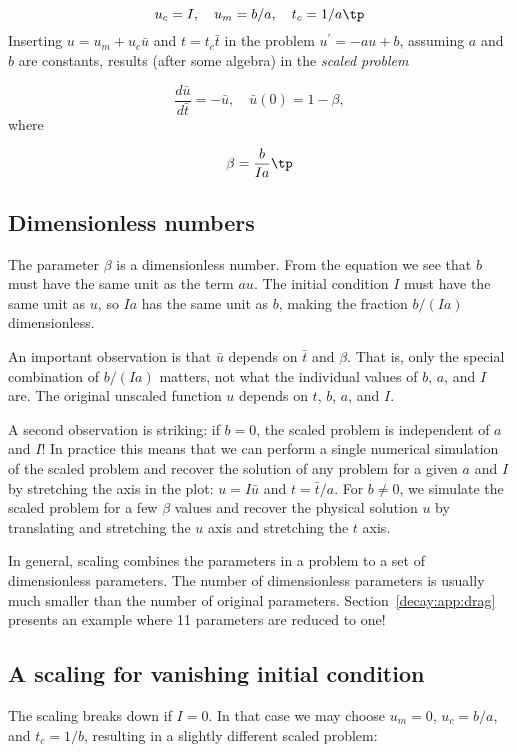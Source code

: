 \documentclass[graybox,sectrefs,envcountresetchap,open=right,final]{svmonodo}
\begin{document}
\[ u_c = I,\quad u_m = b/a,\quad t_c = 1/a\tp\]
Inserting $u=u_m + u_c\bar u$ and $t=t_c\bar t$ in the problem
$u^{\prime}=-au + b$, assuming $a$ and $b$ are constants, results (after some
algebra) in the \emph{scaled problem}

\[ \frac{d\bar u}{d\bar t} = -\bar u,\quad \bar u(0)=1 - \beta,\]
where

\[ \beta = \frac{b}{Ia}\tp\]

\subsection{Dimensionless numbers}

The parameter $\beta$ is a dimensionless number. From the equation we
see that $b$ must have the same unit as the term $au$. The initial
condition $I$ must have the same unit as $u$, so $Ia$ has the same
unit as $b$, making the fraction $b/(Ia)$ dimensionless.

An important observation is that $\bar u$ depends on $\bar t$
and $\beta$.
That is, only the special combination of $b/(Ia)$ matters, not what
the individual values of $b$, $a$, and $I$ are. The original unscaled
function $u$ depends on $t$, $b$, $a$, and $I$.

A second observation is striking: if $b=0$, the scaled problem is
independent of $a$ and $I$! In practice this means that we can perform
a single numerical simulation of the scaled problem and recover the
solution of any problem for a given $a$ and $I$ by stretching the axis
in the plot: $u=I\bar u$ and $t =\bar t/a$.  For $b\neq 0$, we
simulate the scaled problem for a few $\beta$ values and recover the
physical solution $u$ by translating and stretching the $u$ axis and
stretching the $t$ axis.

In general, scaling combines the parameters in a problem to a set
of dimensionless parameters. The number of dimensionless parameters is
usually much smaller than the number of original parameters.
Section~\ref{decay:app:drag} presents an example where 11 parameters
are reduced to one!

\subsection{A scaling for vanishing initial condition}

The scaling breaks down if $I=0$. In that case we may choose $u_m=0$,
$u_c=b/a$, and $t_c=1/b$, resulting in a slightly different scaled problem:
\end{document}
